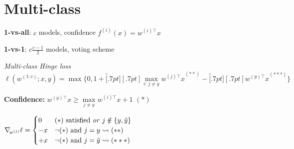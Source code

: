 \section{Multi-class}

\textbf{1-vs-all}: $c$ models, confidence $f^{(i)} (x) = w^{(i )\top} x$

\textbf{1-vs-1}: $c\frac{c-1}{2}$ models, voting scheme

\emph{Multi-class Hinge loss}\\
\vspace{-12pt}
$\ell(w^{(1:c)};x,y) = \max\{ 0, 1\! + \overbracket[.7pt][.7pt]{\max\limits_{i:\,j\neq y} w^{(j)\top}x}^{(\ast\ast)} - \overbracket[.7pt][.7pt]{w^{(y)\top}x}^{(\ast\ast\ast)} \}$

\textbf{Confidence:} $w^{(y)\top}x \geq \max\limits_{j\neq y} w^{(i)\top}x + 1$ {\footnotesize$(\ast)$}

{
$\nabla\!_{w^{(j)}} \ell =
\begin{cases}
	0	& (\ast)\text{ satisfied \textit{or} } j\notin\{y,\hat y\}\\
	-x	& \neg(\ast) \text{ and } j=y		\rightsquigarrow (\ast\ast)\\
	+x	& \neg(\ast) \text{ and } j=\hat y	\rightsquigarrow (\ast\ast\ast)
\end{cases}$
}
